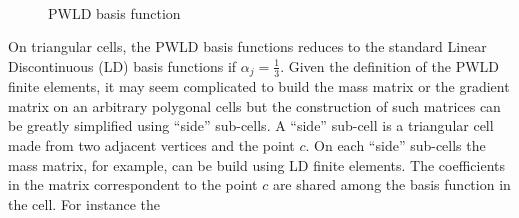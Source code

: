 \begin{figure}[H]
\centering
{}
\\
\caption{PWLD basis function}
\label{pwld}
\end{figure}
On triangular cells, the PWLD basis functions reduces to the standard Linear
Discontinuous (LD) basis functions if $\alpha_j = \frac{1}{3}$. Given the 
definition of the PWLD finite elements, it may seem complicated to build the 
mass matrix or the gradient matrix on an arbitrary polygonal cells but the 
construction of such matrices can be greatly simplified using ``side'' sub-cells. 
A ``side'' sub-cell is a triangular cell made from two adjacent vertices and the 
point $c$. On each ``side'' sub-cells the mass matrix, for example, can be build
using LD finite elements. The coefficients in the matrix correspondent to the 
point $c$ are shared among the basis function in the cell. For instance the

